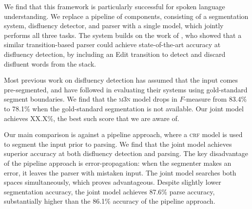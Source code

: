 \documentclass[11pt,letterpaper]{article}
\begin{document}
We find that this framework is particularly successful for spoken language understanding.
We replace a pipeline of components, consisting of a segmentation system,
disfluency detector, and parser with a single model, which jointly performs
all three tasks.  The system builds on the work of \citet{honnibal:14}, who
showed that a similar transition-based parser could achieve state-of-the-art
accuracy at disfluency detection, by including an Edit transition to detect
and discard disfluent words from the stack.

Most previous work on disfluency detection has assumed that the input comes
pre-segmented, and have followed \citet{Charniak01a} in evaluating their systems
using gold-standard segment boundaries.  We find that the \citet{qian:13}
\textsc{m3n} model
drops in $F$-measure from 83.4\% to 78.1\% when
the gold-standard segmentation is not available.  Our joint model
achieves XX.X\%, the best such score that we are aware of.




Our main comparison is against a pipeline approach, where a \textsc{crf} model
is used to segment the input prior to parsing.  We find that the joint model
achieves superior accuracy at both disfluency detection and parsing.
The key disadvantage of the pipeline approach is error-propagation:
when the segmenter makes an error,
it leaves the parser with mistaken input.
The joint model searches both spaces simultaneously,
which proves advantageous.
Despite slightly lower segmentation accuracy, the joint
model achieves 87.6\% parse accuracy, substantially higher than the 86.1\%
accuracy of the pipeline approach.


\end{document}
